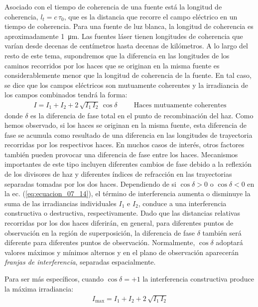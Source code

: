 \documentclass[14pt]{extarticle}
\begin{document}
Asociado con el tiempo de coherencia de una fuente está la longitud de coherencia, $l_{t} = c \, \tau_{0}$, que es la distancia que recorre el campo eléctrico en un tiempo de coherencia. Para una fuente de luz blanca, la longitud de coherencia es aproximadamente \SI{1}{\micro\meter}. Las fuentes láser tienen longitudes de coherencia que varían desde decenas de centímetros hasta decenas de kilómetros. A lo largo del resto de este tema, supondremos que la diferencia en las longitudes de los caminos recorridos por los haces que se originan en la misma fuente es considerablemente menor que la longitud de coherencia de la fuente. En tal caso, se dice que los campos eléctricos son mutuamente coherentes y la irradiancia de los campos combinados tendrá la forma:
\begin{align}
I = I_{1} + I_{2} + 2 \, \sqrt{I_{1} \, I_{2}} \, \cos \delta \hspace{1cm} \text{Haces mutuamente coherentes}
\label{eq:ecuacion_07_14}
\end{align}
donde $\delta$ es la diferencia de fase total en el punto de recombinación del haz. Como hemos observado, si los haces se originan en la misma fuente, esta diferencia de fase se acumula como resultado de una diferencia en las longitudes de trayectoria recorridas por los respectivos haces. En muchos casos de interés, otros factores también pueden provocar una diferencia de fase entre los haces. Mecanismos importantes de este tipo incluyen diferentes cambios de fase debido a la reflexión de los divisores de haz y diferentes índices de refracción en las trayectorias separadas tomadas por los dos haces. Dependiendo de si $\cos \delta > 0$ o $\cos \delta < 0$ en la ec. (\ref{eq:ecuacion_07_14}), el término de interferencia aumenta o disminuye la suma de las irradiancias individuales $I_{1}$ e $I_{2}$, conduce a una interferencia constructiva o destructiva, respectivamente. Dado que las distancias relativas recorridas por los dos haces diferirán, en general, para diferentes puntos de observación en la región de superposición, la diferencia de fase $\delta$ también será diferente para diferentes puntos de observación. Normalmente, $\cos \delta$ adoptará valores máximos y mínimos alternos y en el plano de observación aparecerán \textit{franjas de interferencia}, separadas espacialmente.
\par
Para ser más específicos, cuando $\cos \delta = +1$ la interferencia constructiva produce la máxima irradiancia:
\begin{align}
I_{\max} = I_{1} + I_{2} + 2 \, \sqrt{I_{1} \, I_{2}}
\label{eq:ecuacion_07_15}
\end{align}
\end{document}
